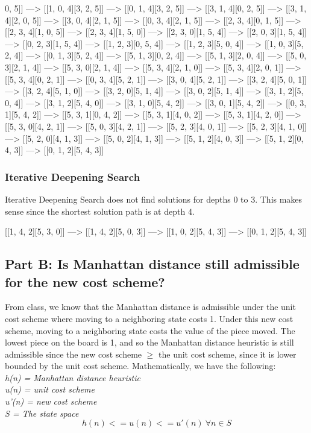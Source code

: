 \documentclass[paper=a4, fontsize=11pt]{scrartcl} %
\numberwithin{equation}{section} %
\numberwithin{figure}{section} %
\numberwithin{table}{section} %
\begin{document}
\begin{center}
0, 5]] ---> [[1, 0, 4][3, 2, 5]] ---> [[0, 1, 4][3, 2, 5]] ---> [[3, 1, 4][0, 2, 5]] ---> [[3, 1, 4][2, 0, 5]] ---> [[3, 0, 4][2, 1, 5]] ---> [[0, 3, 4][2, 1, 5]] ---> [[2, 3, 4][0, 1, 5]] ---> [[2, 3, 4][1, 0, 5]] ---> [[2, 3, 4][1, 5, 0]] ---> [[2, 3, 0][1, 5, 4]] ---> [[2, 0, 3][1, 5, 4]] ---> [[0, 2, 3][1, 5, 4]] ---> [[1, 2, 3][0, 5, 4]] ---> [[1, 2, 3][5, 0, 4]] ---> [[1, 0, 3][5, 2, 4]] ---> [[0, 1, 3][5, 2, 4]] ---> [[5, 1, 3][0, 2, 4]] ---> [[5, 1, 3][2, 0, 4]] ---> [[5, 0, 3][2, 1, 4]] ---> [[5, 3, 0][2, 1, 4]] ---> [[5, 3, 4][2, 1, 0]] ---> [[5, 3, 4][2, 0, 1]] ---> [[5, 3, 4][0, 2, 1]] ---> [[0, 3, 4][5, 2, 1]] ---> [[3, 0, 4][5, 2, 1]] ---> [[3, 2, 4][5, 0, 1]] ---> [[3, 2, 4][5, 1, 0]] ---> [[3, 2, 0][5, 1, 4]] ---> [[3, 0, 2][5, 1, 4]] ---> [[3, 1, 2][5, 0, 4]] ---> [[3, 1, 2][5, 4, 0]] ---> [[3, 1, 0][5, 4, 2]] ---> [[3, 0, 1][5, 4, 2]] ---> [[0, 3, 1][5, 4, 2]] ---> [[5, 3, 1][0, 4, 2]] ---> [[5, 3, 1][4, 0, 2]] ---> [[5, 3, 1][4, 2, 0]] ---> [[5, 3, 0][4, 2, 1]] ---> [[5, 0, 3][4, 2, 1]] ---> [[5, 2, 3][4, 0, 1]] ---> [[5, 2, 3][4, 1, 0]] ---> [[5, 2, 0][4, 1, 3]] ---> [[5, 0, 2][4, 1, 3]] ---> [[5, 1, 2][4, 0, 3]] ---> [[5, 1, 2][0, 4, 3]] ---> [[0, 1, 2][5, 4, 3]]
\end{center}

\subsubsection{Iterative Deepening Search}
Iterative Deepening Search does not find solutions for depths 0 to 3. This makes sense since the shortest solution path is at depth 4.
\begin{center}
[[1, 4, 2][5, 3, 0]] ---> [[1, 4, 2][5, 0, 3]] ---> [[1, 0, 2][5, 4, 3]] ---> [[0, 1, 2][5, 4, 3]]
\end{center}

\subsection{Part B: Is Manhattan distance still admissible for the new cost scheme?}
From class, we know that the Manhattan distance is admissible under the unit cost scheme where moving to a neighboring state costs 1. Under this new cost scheme, moving to a neighboring state costs the value of the piece moved. The lowest piece on the board is 1, and so the Manhattan distance heuristic is still admissible since the new cost scheme \(\geq\) the unit cost scheme, since it is lower bounded by the unit cost scheme. Mathematically, we have the following: \\
\newline
\textit{h(n) = Manhattan distance heuristic \\}
\textit{u(n) = unit cost scheme \\}
\textit{u'(n) = new cost scheme \\}
\textit{S = The state space}
\[h(n) <= u(n) <= u'(n)\ \forall n \in S \]
\end{document}
